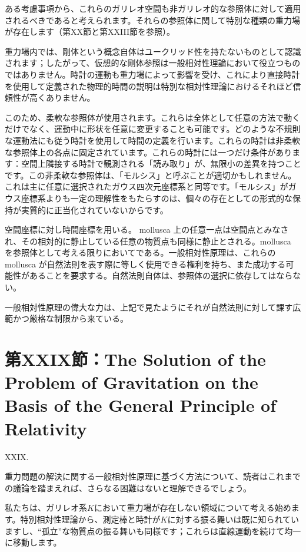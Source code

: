 \documentclass[a4paper,11pt,openany]{ltjsbook}
\begin{document}
ある考慮事項から、これらのガリレオ空間も非ガリレオ的な参照体に対して適用されるべきであると考えられます。それらの参照体に関して特別な種類の重力場が存在します（第XX節と第XXIII節を参照）。

重力場内では、剛体という概念自体はユークリッド性を持たないものとして認識されます；したがって、仮想的な剛体参照は一般相対性理論において役立つものではありません。時計の運動も重力場によって影響を受け、これにより直接時計を使用して定義された物理的時間の説明は特別な相対性理論におけるそれほど信頼性が高くありません。

このため、柔軟な参照体が使用されます。これらは全体として任意の方法で動くだけでなく、運動中に形状を任意に変更することも可能です。どのような不規則な運動法にも従う時計を使用して時間の定義を行います。これらの時計は非柔軟な参照体上の各点に固定されています。これらの時計には一つだけ条件があります：空間上隣接する時計で観測される「読み取り」が、無限小の差異を持つことです。この非柔軟な参照体は、「モルシス」と呼ぶことが適切かもしれません。これは主に任意に選択されたガウス四次元座標系と同等です。「モルシス」がガウス座標系よりも一定の理解性をもたらすのは、個々の存在としての形式的な保持が実質的に正当化されていないからです。

空間座標に対し時間座標を用いる。 mollusca 上の任意一点は空間点とみなされ、その相対的に静止している任意の物質点も同様に静止とされる。mollusca を参照体として考える限りにおいてである。一般相対性原理は、これらの mollusca が自然法則を表す際に等しく使用できる権利を持ち、また成功する可能性があることを要求する。自然法則自体は、参照体の選択に依存してはならない。

一般相対性原理の偉大な力は、上記で見たようにそれが自然法則に対して課す広範かつ厳格な制限から来ている。


\clearpage
\chapter{第XXIX節：The Solution of the Problem of Gravitation on the Basis of the General Principle of Relativity}

XXIX.

重力問題の解決に関する一般相対性原理に基づく方法について、読者はこれまでの議論を踏まえれば、さらなる困難はないと理解できるでしょう。

私たちは、ガリレオ系$K$において重力場が存在しない領域について考える始めます。特別相対性理論から、測定棒と時計が$K$に対する振る舞いは既に知られていますし、“孤立”な物質点の振る舞いも同様です；これらは直線運動を続けて均一に移動します。
\end{document}
